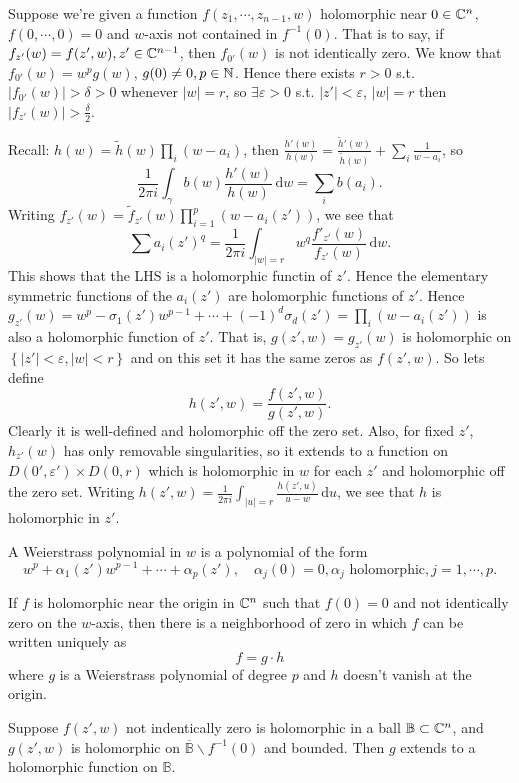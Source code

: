 Suppose we're given a function $f(z_1,\cdots ,z_{n-1},w)$ holomorphic near $0\in \mathbb{C}^{n}$, $f(0,\cdots ,0)=0$ and $w$-axis not contained in $f^{-1}(0)$. That is to say, if $f_{z'}(w)=f(z',w),z' \in  \mathbb{C}^{n-1}$, then $f_{0'}(w)$ is not identically zero. We know that $f_{0'}(w)=w^{p}g(w)$, $g(0)\neq 0,p \in \mathbb{N}$. Hence there exists $r>0$ s.t. $|f_{0'}(w)|>\delta>0$ whenever $|w|=r$, so $\exists \varepsilon >0$ s.t. $|z'|<\varepsilon $, $|w|=r$ then $|f_{z'}(w)|>\frac{\delta}{2}$. 

Recall: $h(w)=\widetilde{h}(w)\prod_i (w-a_i)$, then $\frac{h'(w)}{h(w)}=\frac{\widetilde{h}'(w)}{\widetilde{h}(w)}+\sum_{i}^{} \frac{1}{w-a_i}$, so 
\[
  \frac{1}{2\pi i}\int_{\gamma}b(w) \frac{h'(w)}{h(w)}\,\mathrm{d}w=\sum_{i}b(a_i).
\]
Writing $f_{z'}(w)=\widetilde{f}_{z'}(w)\prod_{i=1}^{p}\left( w-a_i(z') \right) $, we see that
\[
  \sum a_i(z')^{q}=\frac{1}{2\pi i}\int_{|w|=r}w^{q}\frac{f'_{z'}(w)}{f_{z'}(w)}\,\mathrm{d}w.
\]
This shows that the LHS is a holomorphic functin of $z'$. Hence the elementary symmetric functions of the  $a_i(z')$ are holomorphic functions of  $z'$. Hence $g_{z'}(w)=w^{p}-\sigma_1(z')w^{p-1}+\cdots +(-1)^{d}\sigma_{d}(z')=\prod_{i}(w-a_i(z'))$ is also a holomorphic function of $z'$. That is, $g(z',w)=g_{z'}(w)$ is holomorphic on $\left\{|z'|<\varepsilon ,|w|<r\right\} $ and on this set it has the same zeros as $f(z',w)$. So lets define 
\[
  h(z',w)=\frac{f(z',w)}{g(z',w)}.
\] 
Clearly it is well-defined and holomorphic off the zero set. Also, for fixed $z'$, $h_{z'}(w)$ has only removable singularities, so it extends to a function on $D(0',\varepsilon ')\times D(0,r)$ which is holomorphic in $w$ for each $z'$ and holomorphic off the zero set. Writing $h(z',w)=\frac{1}{2\pi i}\int_{|u|=r}\frac{h(z',u)}{u-w}\,\mathrm{d}u$, we see that $h$ is holomorphic in $z'$.

A Weierstrass polynomial in $w$ is a polynomial of the form
\[
  w^{p}+\alpha_1(z')w^{p-1}+\cdots +\alpha_p(z'),\quad \alpha_j(0)=0,  \alpha_j \text{ holomorphic},j=1,\cdots ,p.
\]
\begin{theorem}
  If  $f$ is holomorphic near the origin in $\mathbb{C}^{n}$ such that $f(0)=0$ and not identically zero on the  $w$-axis, then there is a neighborhood of  zero in which $f$ can be written uniquely as 
  \[
  f=g\cdot h
  \] 
  where $g$ is a Weierstrass polynomial of degree $p$ and $h$ doesn't vanish at the origin.
\end{theorem}

\begin{theorem}
  Suppose $f(z',w)$ not indentically zero is holomorphic in a ball $\mathbb{B}\subset \mathbb{C}^{n}$, and $g(z',w)$ is holomorphic on $\overline{\mathbb{B}} \backslash  f^{-1}(0)$ and bounded. Then $g$ extends to a holomorphic function on $\mathbb{B}$.
\end{theorem}

